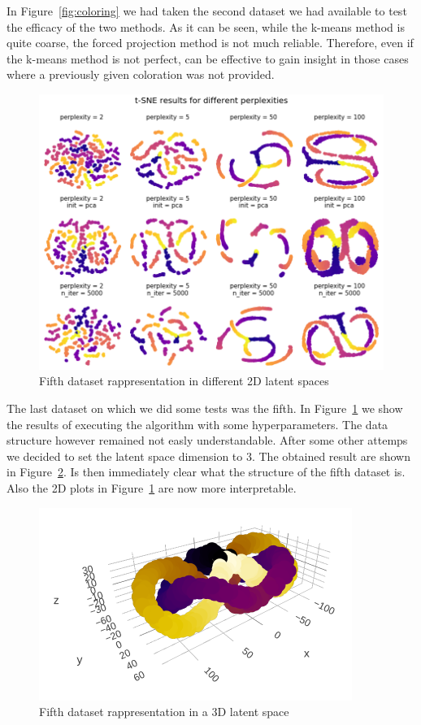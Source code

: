 \documentclass[%
 aip,
 jmp,%
 amsmath,amssymb,
 reprint,%
]{revtex4-1}
\begin{document}
In Figure~\ref{fig:coloring} we had taken the second dataset we had
available to test the efficacy of the two methods. As it can be
seen, while the k-means method is quite coarse, the forced projection method
is not much reliable. Therefore, even if the k-means method is not
perfect, can be effective to gain insight in those cases where a previously
given coloration was not provided.

\begin{figure}[h]
 \includegraphics[scale=0.26]{images/fifth.png}
 \caption{Fifth dataset rappresentation in different 2D latent spaces}
 \label{fig:fifth}
\end{figure}

The last dataset on which we did some tests was the fifth. In Figure~\ref{fig:fifth}
we show the results of executing the algorithm with some hyperparameters.
The data structure however remained not easly understandable. After some
other attemps we decided to set the latent space dimension to 3. The
obtained result are shown in Figure~\ref{fig:3d}.
Is then immediately clear what the structure of the fifth dataset is.
Also the 2D plots in Figure~\ref{fig:fifth} are now more interpretable.
\begin{figure}[h]
 \includegraphics[scale=2]{images/3d.png}
 \caption{Fifth dataset rappresentation in a 3D latent space}
 \label{fig:3d}
\end{figure}
\end{document}
